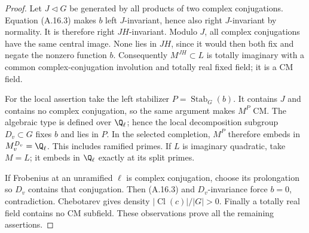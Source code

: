 \begin{proof}
Let $J\lhd G$ be generated by all products of two complex
conjugations. Equation (A.16.3) makes $b$ left $J$-invariant,
hence also right $J$-invariant by normality. It is therefore
right $JH$-invariant. Modulo $J$, all complex conjugations have
the same central image. None lies in $JH$, since it would then
both fix and negate the nonzero function $b$. Consequently
$M^{JH}\subset L$ is totally imaginary with a common
complex-conjugation involution and totally real fixed field;
it is a CM field.

For the local assertion take the left stabilizer
$P=\operatorname{Stab}_G(b)$. It contains $J$ and contains no
complex conjugation, so the same argument makes $M^P$ CM.
The algebraic type is defined over $\Q_\ell$; hence the local
decomposition subgroup $D_v\subset G$ fixes $b$ and lies in
$P$. In the selected completion, $M^P$ therefore embeds in
$M_v^{D_v}=\Q_\ell$. This includes ramified primes. If $L$ is
imaginary quadratic, take $M=L$; it embeds in $\Q_\ell$ exactly
at its split primes.

If Frobenius at an unramified $\ell$ is complex conjugation,
choose its prolongation so $D_v$ contains that conjugation.
Then (A.16.3) and $D_v$-invariance force $b=0$, contradiction.
Chebotarev gives density $|\operatorname{Cl}(c)|/|G|>0$.
Finally a totally real field contains no CM subfield. These
observations prove all the remaining assertions.
\end{proof}

